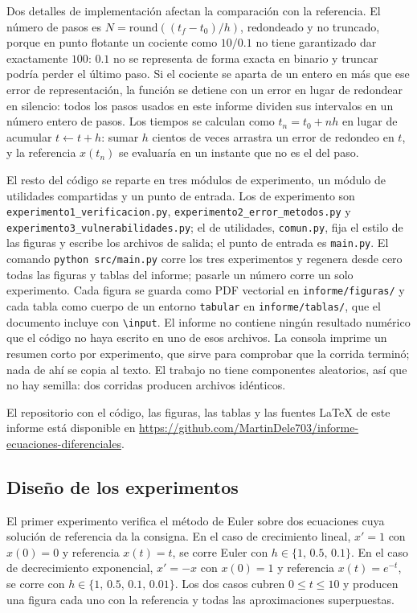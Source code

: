 Dos detalles de implementación afectan la comparación con la referencia. El número de pasos es
$N = \mathrm{round}((t_f - t_0)/h)$, redondeado y no truncado, porque en punto flotante un
cociente como $10/0.1$ no tiene garantizado dar exactamente $100$: $0.1$ no se representa de
forma exacta en binario y truncar podría perder el último paso. Si el cociente se aparta de un
entero en más que ese error de representación, la función se detiene con un error en lugar de
redondear en silencio: todos los pasos usados en este informe dividen sus intervalos en un
número entero de pasos. Los tiempos se calculan como
$t_n = t_0 + n h$ en lugar de acumular $t \leftarrow t + h$: sumar $h$ cientos de veces arrastra
un error de redondeo en $t$, y la referencia $x(t_n)$ se evaluaría en un instante que no es el
del paso.

El resto del código se reparte en tres módulos de experimento, un módulo de utilidades
compartidas y un punto de entrada. Los de experimento son
\texttt{experimento1\_\allowbreak verificacion.py},
\texttt{experimento2\_\allowbreak error\_\allowbreak metodos.py} y
\texttt{experimento3\_\allowbreak vulnerabilidades.py}; el de utilidades, \texttt{comun.py},
fija el estilo de las figuras y escribe los archivos de salida; el punto de entrada es
\texttt{main.py}. El comando \texttt{python src/main.py} corre los tres
experimentos y regenera desde cero todas las figuras y tablas del informe; pasarle un número
corre un solo experimento. Cada figura se guarda como PDF vectorial en \texttt{informe/figuras/}
y cada tabla como cuerpo de un entorno \texttt{tabular} en \texttt{informe/tablas/}, que el
documento incluye con \texttt{\textbackslash input}. El informe no contiene ningún resultado
numérico que el código no haya escrito en uno de esos archivos. La consola imprime un resumen
corto por experimento, que sirve para comprobar que la corrida terminó; nada de ahí se copia al
texto. El trabajo no tiene componentes aleatorios, así que no hay semilla: dos corridas producen
archivos idénticos.

El repositorio con el código, las figuras, las tablas y las fuentes \LaTeX{} de este informe está
disponible en \url{https://github.com/MartinDele703/informe-ecuaciones-diferenciales}.

\subsection{Diseño de los experimentos}
\label{subsec:diseno}

El primer experimento verifica el método de Euler sobre dos ecuaciones cuya solución de
referencia da la consigna. En el caso de crecimiento lineal, $x' = 1$ con $x(0) = 0$ y referencia
$x(t) = t$, se corre Euler con $h \in \{1,\, 0.5,\, 0.1\}$. En el caso de decrecimiento
exponencial, $x' = -x$ con $x(0) = 1$ y referencia $x(t) = e^{-t}$, se corre con
$h \in \{1,\, 0.5,\, 0.1,\, 0.01\}$. Los dos casos cubren $0 \le t \le 10$ y producen una figura
cada uno con la referencia y todas las aproximaciones superpuestas.

